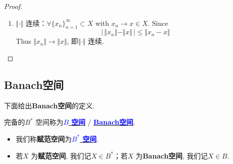 \begin{defn}
\begin{rmk}
\begin{itemize}
\begin{itemize}
\begin{proof}
\begin{enumerate}
							\vspace*{2em}
							
							\item $\Vert \cdot \Vert$ 连续：$\forall \{ x_n \}_{n = 1}^{\infty} \subset X$ with $x_n \to x \in X$. Since
							\[ \Big| \, \Vert x_n \Vert - \Vert x \Vert \, \Big| \leq \Vert x_n - x \Vert \]
							Thus $\Vert x_n \Vert \to \Vert x \Vert$, 即$\Vert \cdot \Vert$ 连续.
						\end{enumerate}
					\end{proof}
				\end{itemize}
			\end{itemize}
		\end{rmk}
	\end{defn}

\newpage

\subsection{Banach空间}
	下面给出\textbf{Banach空间}的定义.
	
	\begin{defn}\label{def 2.1.2}
		完备的$B^*$ 空间称为\underline{\textcolor{blue}{\textbf{$B$ 空间}}} / \underline{\textcolor{blue}{\textbf{Banach空间}}}. 
		
		\vspace*{2em}
		
		\begin{rmk}
			\begin{itemize}
				\item 我们称\textbf{赋范空间}为\underline{\textcolor{blue}{\textbf{$B^*$ 空间}}}. 
				
				\vspace*{1em}
				
				\item 若$X$ 为\textbf{赋范空间}, 我们记$X \in B^*$；若$X$ 为\textbf{Banach空间}, 我们记$X \in B$.
			\end{itemize}
		\end{rmk}
	\end{defn}






	\ifx\allfiles\undefined

\fi